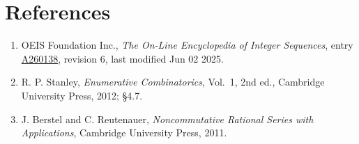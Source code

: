 \documentclass[11pt]{article}
\theoremstyle{definition}
\begin{document}
\section{References}

\begin{enumerate}

\item OEIS Foundation Inc., \emph{The On-Line Encyclopedia of Integer Sequences}, entry \href{https://oeis.org/A260138}{A260138}, revision 6, last modified Jun 02 2025.

\item R. P. Stanley, \emph{Enumerative Combinatorics}, Vol.~1, 2nd ed., Cambridge University Press, 2012; \S4.7.

\item J. Berstel and C. Reutenauer, \emph{Noncommutative Rational Series with Applications}, Cambridge University Press, 2011.

\end{enumerate}
\end{document}
